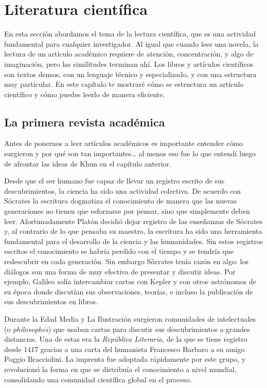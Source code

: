 \chapter{Literatura científica}
\label{cha:literaturacientifica}

En esta sección abordamos el tema de la lectura científica, que es una actividad
fundamental para cualquier investigador.
Al igual que cuando lees una novela, la lectura de un artículo académico
requiere de atención, concentración, y algo de imaginación, pero las similitudes
terminan ahí.
Los libros y artículos científicos son textos densos, con un lenguaje técnico y
especializado, y con una estructura muy particular.
En este capítulo te mostraré cómo se estructura un artículo científico y cómo
puedes leerlo de manera eficiente.

\section{La primera revista académica}
\label{sec:contexto}
Antes de ponernos a leer artículos académicos es importante entender cómo
surgieron y por qué son tan importantes… al menos eso fue lo que entendí luego
de afrontar las ideas de Khun en el capítulo anterior.

Desde que el ser humano fue capaz de llevar un registro escrito de sus
descubrimientos, la ciencia ha sido una actividad colectiva.
De acuerdo con Sócrates la escritura dogmatiza el conocimiento de manera que las
nuevas generaciones no tienen que esforzarse por pensar, sino que simplemente
deben leer.
Afortunadamente Platón decidió dejar registro de las enseñanzas de Sócrates y,
al contrario de lo que pensaba su maestro, la escritura ha sido una herramienta
fundamental para el desarrollo de la ciencia y las humanidades.
Sin estos registros escritos el conocimiento se habría perdido con el tiempo y
se tendría que redescubrir en cada generación.
Sin embargo Sócrates tenía razón en algo: los diálogos son una forma de
muy efectiva de presentar y discutir ideas.
Por ejemplo, Galileo solía intercambiar cartas con Kepler y con otros astrónomos
de su época donde discutían sus observaciones, teorías, e incluso la publicación
de sus descubrimientos en libros.

Durante la Edad Media y La Ilustración surgieron comunidades de intelectuales (o
\emph{philosophes}) que usaban cartas para discutir sus descubrimientos a
grandes distancias.
Una de estas era la \emph{República Literaria}, de la que se tiene registro
desde 1417 gracias a una carta del humanista Francesco Barbaro a su amigo Poggio
Bracciolini.
La imprenta fue adoptada rápidamente por este grupo, y revolucionó la forma en
que se distribuía el conocimiento a nivel mundial, consolidando una comunidad
científica global en el proceso.

